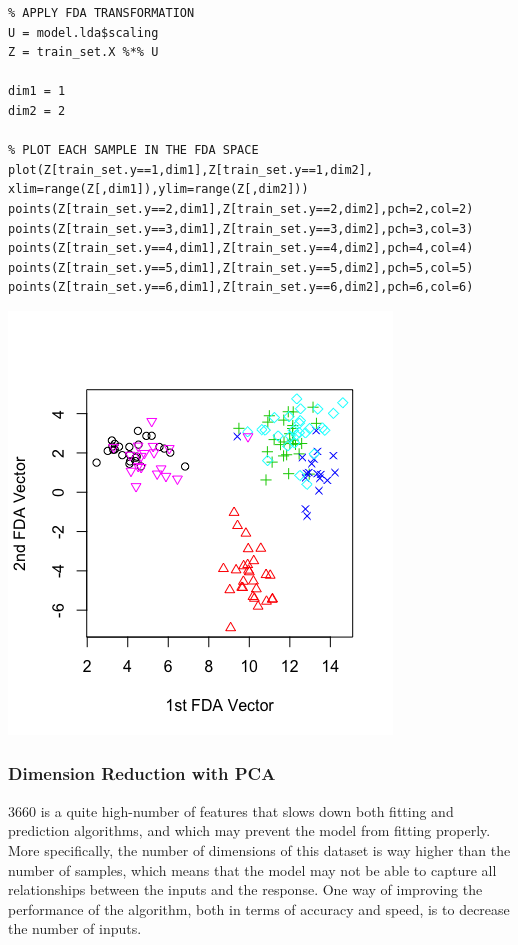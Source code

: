 \documentclass[]{report}
\begin{document}
\begin{lstlisting}
% APPLY FDA TRANSFORMATION
U = model.lda$scaling
Z = train_set.X %*% U

dim1 = 1
dim2 = 2

% PLOT EACH SAMPLE IN THE FDA SPACE
plot(Z[train_set.y==1,dim1],Z[train_set.y==1,dim2], xlim=range(Z[,dim1]),ylim=range(Z[,dim2]))
points(Z[train_set.y==2,dim1],Z[train_set.y==2,dim2],pch=2,col=2)
points(Z[train_set.y==3,dim1],Z[train_set.y==3,dim2],pch=3,col=3)
points(Z[train_set.y==4,dim1],Z[train_set.y==4,dim2],pch=4,col=4)
points(Z[train_set.y==5,dim1],Z[train_set.y==5,dim2],pch=5,col=5)
points(Z[train_set.y==6,dim1],Z[train_set.y==6,dim2],pch=6,col=6)
\end{lstlisting}

\begin{center}
	\includegraphics[width=0.6\linewidth]{Figures/plot_fda_1_2.png}
	\label{fig:plot_fda_1_2}
\end{center}

\subsubsection{Dimension Reduction with PCA}
3660 is a quite high-number of features that slows down both fitting and prediction algorithms, and which may prevent the model from fitting properly. More specifically, the number of dimensions of this dataset is way higher than the number of samples, which means that the model may not be able to capture all relationships between the inputs and the response. One way of improving the performance of the algorithm, both in terms of accuracy and speed, is to decrease the number of inputs.
\end{document}
